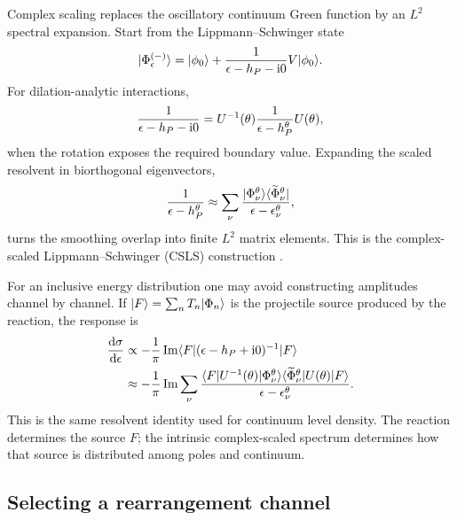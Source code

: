 Complex scaling replaces the oscillatory continuum Green function by an
$L^2$ spectral expansion.  Start from the Lippmann--Schwinger state
\begin{equation}
  \lvert \Phi_\epsilon^{(-)} \rangle
  =\lvert \phi_0 \rangle
  +\frac{1}{\epsilon-h_P-\mathrm{i}0}V\lvert \phi_0 \rangle.
  \label{eq:projectile-lippmann-schwinger}
\end{equation}
For dilation-analytic interactions,
\begin{equation}
  \frac{1}{\epsilon-h_P-\mathrm{i}0}
  =U^{-1}(\theta)
   \frac{1}{\epsilon-h_P^\theta}
   U(\theta),
  \label{eq:csls-resolvent-rotation}
\end{equation}
when the rotation exposes the required boundary value.  Expanding the scaled
resolvent in biorthogonal eigenvectors,
\begin{equation}
  \frac{1}{\epsilon-h_P^\theta}
  \approx\sum_\nu
  \frac{\lvert \Phi_\nu^\theta \rangle
        \langle \widetilde\Phi_\nu^\theta \rvert}
       {\epsilon-\epsilon_\nu^\theta},
  \label{eq:csls-pseudostate-resolvent}
\end{equation}
turns the smoothing overlap into finite $L^2$ matrix elements.  This is the
complex-scaled Lippmann--Schwinger (CSLS) construction
\cite{Kikuchi2009CSLS,Kikuchi2010CSLS}.

For an inclusive energy distribution one may avoid constructing amplitudes
channel by channel.  If $\lvert F \rangle=\sum_nT_n\lvert \Phi_n \rangle$ is the projectile
source produced by the reaction, the response is
\begin{align}
  \frac{\mathrm{d}\sigma}{\mathrm{d}\epsilon}
  &\propto
  -\frac{1}{\pi}\operatorname{Im}
  \langle F \rvert(\epsilon-h_P+\mathrm{i}0)^{-1}\lvert F \rangle
  \notag\\
  &\approx-\frac{1}{\pi}\operatorname{Im}\sum_\nu
  \frac{
  \langle F \rvert U^{-1}(\theta)\lvert \Phi_\nu^\theta \rangle
  \langle \widetilde\Phi_\nu^\theta \rvert U(\theta)\lvert F \rangle}
  {\epsilon-\epsilon_\nu^\theta}.
  \label{eq:complex-scaled-breakup-response}
\end{align}
This is the same resolvent identity used for continuum level density.  The
reaction determines the source $F$; the intrinsic complex-scaled spectrum
determines how that source is distributed among poles and continuum.

\subsection{Selecting a rearrangement channel}
\label{subsec:cdcc-rearrangement-selection}

